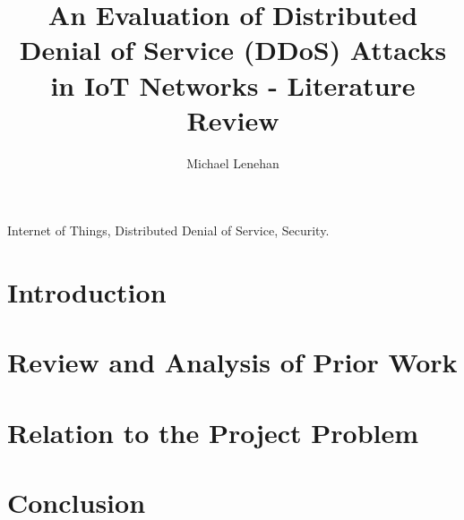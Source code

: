 \documentclass[a4paper, journal]{IEEEtran}
\begin{document}
\hypersetup{pageanchor=false}

\hypersetup{pageanchor=true}
\title{An Evaluation of Distributed Denial of Service (DDoS) Attacks in IoT
Networks - Literature Review}
\author{Michael Lenehan}

%
{}

\maketitle

\begin{abstract}
	
\end{abstract}

\begin{IEEEkeywords}
	Internet of Things, Distributed Denial of Service, Security.
\end{IEEEkeywords}

\section{Introduction}


\section{Review and Analysis of Prior Work}


\section{Relation to the Project Problem}


\section{Conclusion}



\printbibliography
\end{document}
